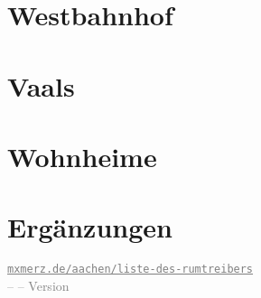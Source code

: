\documentclass[8pt]{article}
\begin{document}
\section{Westbahnhof}
\label{sec:westbahnhof}

\begin{locations}
\end{locations}

\section{Vaals}
\label{sec:vaals}

\begin{locations}
\end{locations}

\section{Wohnheime}
\label{sec:wohnheime}

\begin{locations}
\end{locations}

\section{Ergänzungen}
\label{sec:erganzungen}

\begin{emptylocations}
	\emptylocation{}
	\emptylocation{}
	\emptylocation{}
	\emptylocation{}
	\emptylocation{}
	\emptylocation{}
	\emptylocation{}
\end{emptylocations}

\vfill
\centering
\makeatletter
{\small \textcolor{gray}{
	\texttt{\underline{mxmerz.de/aachen/liste-des-rumtreibers}} \\
	\@author{} -- \@date{} -- Version \theVersion
}\par}
\makeatother
\end{document}

